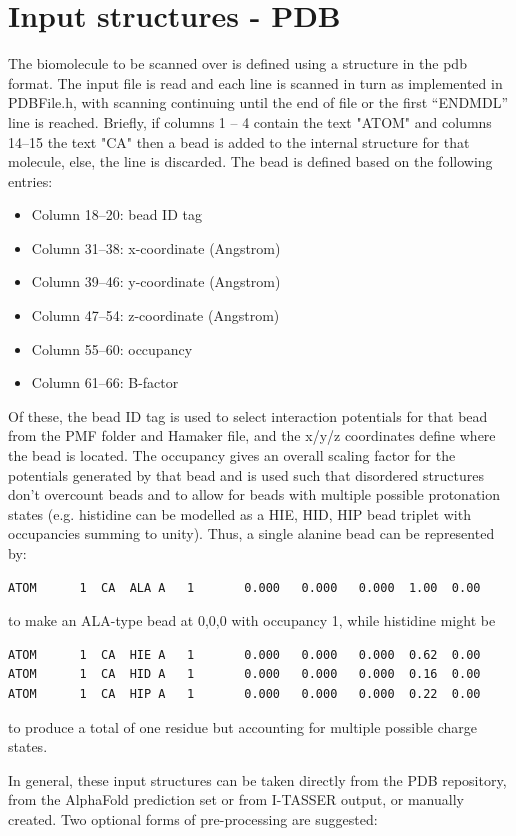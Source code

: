 \documentclass[10pt,a4paper,onecolumn]{report}
\begin{document}
\section{Input structures - PDB}
The biomolecule to be scanned over is defined using a structure in the pdb format. The input file is read and each line is scanned in turn as implemented in PDBFile.h, with scanning continuing until the end of file or the first ``ENDMDL'' line is reached. Briefly, if columns 1 -- 4 contain the text "ATOM" and columns 14--15 the text "CA" then a bead is added to the internal structure for that molecule, else, the line is discarded.  The bead is defined based on the following entries:
\begin{itemize}
\item Column 18--20: bead ID tag
\item Column 31--38: x-coordinate (Angstrom)
\item Column 39--46: y-coordinate (Angstrom)
\item Column 47--54: z-coordinate (Angstrom)
\item Column 55--60: occupancy
\item Column 61--66: B-factor
\end{itemize}


Of these, the bead ID tag is used to select interaction potentials for that bead from the PMF folder and Hamaker file, and the x/y/z coordinates define where the bead is located. The occupancy gives an overall scaling factor for the potentials generated by that bead and is used such that disordered structures don't overcount beads and to allow for beads with multiple possible protonation states (e.g. histidine can be modelled as a HIE, HID, HIP bead triplet with occupancies summing to unity).  Thus, a single alanine bead can be represented by:

\begin{lstlisting}
ATOM      1  CA  ALA A   1       0.000   0.000   0.000  1.00  0.00
\end{lstlisting}
to make an ALA-type bead at 0,0,0 with occupancy 1, while histidine might be
\begin{lstlisting}
ATOM      1  CA  HIE A   1       0.000   0.000   0.000  0.62  0.00
ATOM      1  CA  HID A   1       0.000   0.000   0.000  0.16  0.00
ATOM      1  CA  HIP A   1       0.000   0.000   0.000  0.22  0.00
\end{lstlisting}
to produce a total of one residue but accounting for multiple possible charge states.


In general, these input structures can be taken directly from the PDB repository, from the AlphaFold prediction set or from I-TASSER output, or manually created. Two optional forms of pre-processing are suggested:
\end{document}
